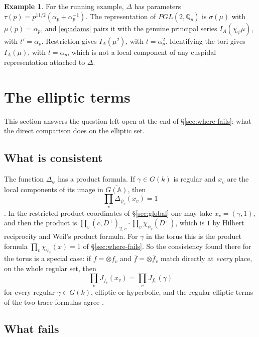 \documentclass[12pt,letterpaper,openany]{book}
\theoremstyle{plain}
\theoremstyle{definition}
\newtheorem{example}[theorem]{Example}
\theoremstyle{remark}
\theoremstyle{remark}
\begin{document}
\begin{example}
For the running example, $\Delta$ has parameters
$\tau(p)=p^{11/2}(\alpha_p+\alpha_p^{-1})$. The representation of
$PGL(2,{\mathbb Q}_p)$ is $\sigma(\mu)$ with $\mu(p)=\alpha_p$, and
\eqref{eq:adams} pairs it with the genuine principal series
$I_A(\chi_\psi\mu)$, with $t'=\alpha_p$. Restriction gives $I_A(\mu^2)$,
with $t=\alpha_p^2$. Identifying the tori gives $I_A(\mu)$, with
$t=\alpha_p$, which is not a local component of any cuspidal
representation attached to $\Delta$.
\end{example}

\section{The elliptic terms}\label{sec:cover-elliptic}

This section answers the question left open at the end of
\S\ref{sec:where-fails}: what the direct comparison does on the elliptic
set.

\subsection*{What is consistent}

The function $\Delta_\psi$ has a product formula. If $\gamma\in G(k)$ is
regular and $x_v$ are the local components of its image in
$\overline{G({\mathbb A})}$, then
\begin{equation}\label{eq:Delta-product}
\prod_v\Delta_{\psi_v}(x_v)=1
\end{equation}
\cite[Lemma~8.4]{JC}. In the restricted-product coordinates of
\S\ref{sec:global} one may take $x_v=(\gamma,1)$, and then the product is
$\prod_v(c,D^+)_{2,v}\cdot\prod_v\chi_{\psi_v}(D^+)$, which is $1$ by
Hilbert reciprocity and Weil's product formula. For $\gamma$ in the
torus this is the product formula $\prod_v\chi_{\psi_v}(x)=1$ of
\S\ref{sec:where-fails}. So the consistency found there for the torus is
a special case: if $f=\otimes f_v$ and $\overline f=\otimes\overline f_v$
match directly at \emph{every} place, on the whole regular set, then
\[
\prod_vJ_{\overline f_v}(x_v)=\prod_vJ_{f_v}(\gamma)
\]
for every regular $\gamma\in G(k)$, elliptic or hyperbolic, and the
regular elliptic terms of the two trace formulas agree
\cite[Corollary~8.5]{JC}.

\subsection*{What fails}
\end{document}
